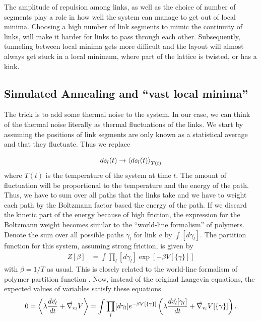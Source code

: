 \documentclass[nofootinbib,preprint,floatfix,titlepage,endfloats,superscriptaddress]{revtex4} %
\begin{document}
The amplitude of repulsion among links, as well as the choice of number of segments  play a role in how well the system can manage to get out of local minima. 
Choosing a high number of link segments to mimic the continuity of links, will make it harder for links to pass through each other. 
Subsequently, tunneling between local minima gets more difficult and the layout will almost always get stuck in a local minimum, where part of the lattice is twisted, or has a kink.


\subsection{Simulated Annealing and ``vast local minima'' \label{ap:annealing}}
The trick is to add some thermal noise to the system. In our case, we can think of the thermal noise literally as thermal fluctuations of the links. We start by assuming the positions of link segments are only known as a statistical average and that they fluctuate. Thus we replace

\[ds_l(t) \to \left<ds_l(t)\right>_{T(t)} \]
where $T(t)$ is the temperature of the system at time $t$. 
The amount of fluctuation will be proportional to the temperature and the energy of the path. Thus, we have to sum over all paths that the links take and we have to weight each path by the Boltzmann factor based the energy of the path. If we discard the kinetic part of the energy because of high friction, the expression for the Boltzmann weight becomes similar to the ``world-line formalism'' of polymers. Denote the sum over all possible paths $\gamma_l$ for link $a$ by $\int [d\gamma_l]$. The partition function for this system, assuming strong friction, is given by
\begin{align}
    Z[\beta] & = \int \prod_l [d\gamma_l] \exp\left[-\beta V[\{\gamma\}]\right]  
\end{align}
with $\beta = 1/T$ as usual. 
This is closely related to the world-line formalism of polymer partition function \cite{des1974lagrangian}. 
Now, instead of the original Langevin equations, the expected values of variables satisfy these equations
\begin{equation}
0= \left<\lambda {d \vec{v}_l \over dt } + \vec{\nabla}_{{v}_l} V\right> = \int \prod_l [d\gamma_l] e^{-\beta V[\{\gamma\}]}\left(\lambda {d \vec{v}_l[\gamma_l] \over dt } + \vec{\nabla}_{{v}_l} V[\{\gamma\}]\right)  \label{eq:Langevin2}.
\end{equation}
\end{document}
